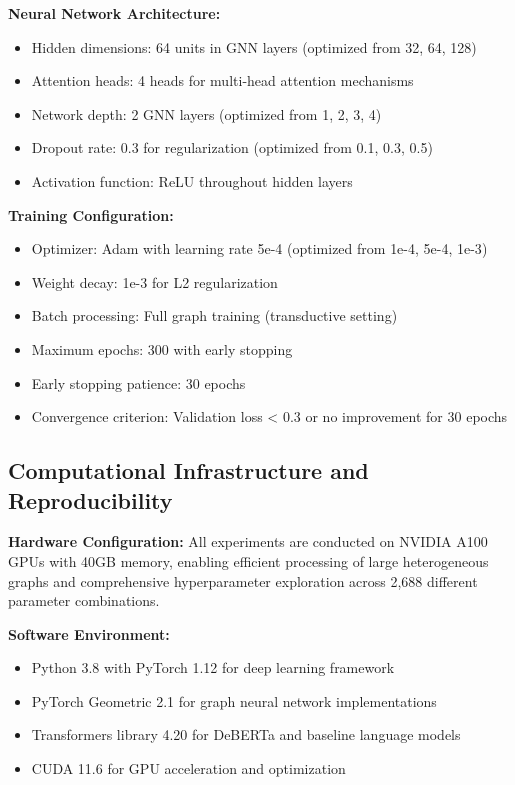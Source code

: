 \textbf{Neural Network Architecture:}
\begin{itemize}
\item Hidden dimensions: 64 units in GNN layers (optimized from {32, 64, 128})
\item Attention heads: 4 heads for multi-head attention mechanisms
\item Network depth: 2 GNN layers (optimized from {1, 2, 3, 4})
\item Dropout rate: 0.3 for regularization (optimized from {0.1, 0.3, 0.5})
\item Activation function: ReLU throughout hidden layers
\end{itemize}

\textbf{Training Configuration:}
\begin{itemize}
\item Optimizer: Adam with learning rate 5e-4 (optimized from {1e-4, 5e-4, 1e-3})
\item Weight decay: 1e-3 for L2 regularization
\item Batch processing: Full graph training (transductive setting)
\item Maximum epochs: 300 with early stopping
\item Early stopping patience: 30 epochs
\item Convergence criterion: Validation loss < 0.3 or no improvement for 30 epochs
\end{itemize}

\subsection{Computational Infrastructure and Reproducibility}

\textbf{Hardware Configuration:} All experiments are conducted on NVIDIA A100 GPUs with 40GB memory, enabling efficient processing of large heterogeneous graphs and comprehensive hyperparameter exploration across 2,688 different parameter combinations.

\textbf{Software Environment:}
\begin{itemize}
\item Python 3.8 with PyTorch 1.12 for deep learning framework
\item PyTorch Geometric 2.1 for graph neural network implementations
\item Transformers library 4.20 for DeBERTa and baseline language models
\item CUDA 11.6 for GPU acceleration and optimization
\end{itemize}


